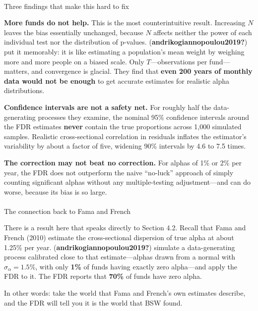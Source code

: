 \documentclass[
  letterpaper,
  DIV=11,
  numbers=noendperiod]{scrartcl}
\makeatletter
\let\oldparagraph\paragraph
\renewcommand{\paragraph}{
    \@ifstar
      \xxxParagraphStar
      \xxxParagraphNoStar
  }
\newcommand{\xxxParagraphStar}[1]{\oldparagraph*{#1}\mbox{}}
\newcommand{\xxxParagraphNoStar}[1]{\oldparagraph{#1}\mbox{}}
\makeatother
\begin{document}
\paragraph{Three findings that make this hard to
fix}\label{three-findings-that-make-this-hard-to-fix}

\textbf{More funds do not help.} This is the most counterintuitive
result. Increasing \(N\) leaves the bias essentially unchanged, because
\(N\) affects neither the power of each individual test nor the
distribution of p-values. (\textbf{andrikogiannopoulou2019?}) put it
memorably: it is like estimating a population's mean weight by weighing
more and more people on a biased scale. Only \(T\)---observations per
fund---matters, and convergence is glacial. They find that \textbf{even
200 years of monthly data would not be enough} to get accurate estimates
for realistic alpha distributions.

\textbf{Confidence intervals are not a safety net.} For roughly half the
data-generating processes they examine, the nominal 95\% confidence
intervals around the FDR estimates \textbf{never} contain the true
proportions across 1,000 simulated samples. Realistic cross-sectional
correlation in residuals inflates the estimator's variability by about a
factor of five, widening 90\% intervals by 4.6 to 7.5 times.

\textbf{The correction may not beat no correction.} For alphas of 1\% or
2\% per year, the FDR does not outperform the naive ``no-luck'' approach
of simply counting significant alphas without any multiple-testing
adjustment---and can do worse, because its bias is so large.

\paragraph{The connection back to Fama and
French}\label{the-connection-back-to-fama-and-french}

There is a result here that speaks directly to Section 4.2. Recall that
Fama and French (2010) estimate the cross-sectional dispersion of true
alpha at about 1.25\% per year. (\textbf{andrikogiannopoulou2019?})
simulate a data-generating process calibrated close to that
estimate---alphas drawn from a normal with \(\sigma_\alpha = 1.5\%\),
with only \textbf{1\%} of funds having exactly zero alpha---and apply
the FDR to it. The FDR reports that \textbf{70\%} of funds have zero
alpha.

In other words: take the world that Fama and French's own estimates
describe, and the FDR will tell you it is the world that BSW found.
\end{document}
